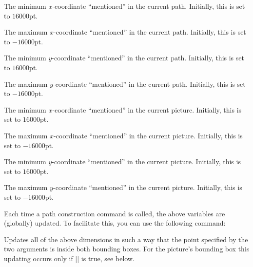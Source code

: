 \begin{textoken}{\pgf@pathminx}
  The minimum $x$-coordinate ``mentioned'' in the current
  path. Initially, this is set to $16000$pt.
\end{textoken}

\begin{textoken}{\pgf@pathmaxx}
  The maximum $x$-coordinate ``mentioned'' in the current
  path. Initially, this is set to $-16000$pt.
\end{textoken}

\begin{textoken}{\pgf@pathminy}
  The minimum $y$-coordinate ``mentioned'' in the current
  path. Initially, this is set to $16000$pt.
\end{textoken}

\begin{textoken}{\pgf@pathmaxy}
  The maximum $y$-coordinate ``mentioned'' in the current
  path. Initially, this is set to $-16000$pt.
\end{textoken}

\begin{textoken}{\pgf@picminx}
  The minimum $x$-coordinate ``mentioned'' in the current
  picture. Initially, this is set to $16000$pt.
\end{textoken}

\begin{textoken}{\pgf@picmaxx}
  The maximum $x$-coordinate ``mentioned'' in the current
  picture. Initially, this is set to $-16000$pt.
\end{textoken}

\begin{textoken}{\pgf@picminy}
  The minimum $y$-coordinate ``mentioned'' in the current
  picture. Initially, this is set to $16000$pt.
\end{textoken}

\begin{textoken}{\pgf@picmaxy}
  The maximum $y$-coordinate ``mentioned'' in the current
  picture. Initially, this is set to $-16000$pt.
\end{textoken}


Each time a path construction command is called, the above variables
are (globally) updated. To facilitate this, you can use the following
command:

\begin{command}{\pgf@protocolsizes{}}
  Updates all of the above dimensions in such a way that the point
  specified by the two arguments is inside both bounding boxes. For
  the picture's bounding box this updating occurs only if
  |\ifpgf@relevantforpicturesize| is true, see below.
\end{command}

